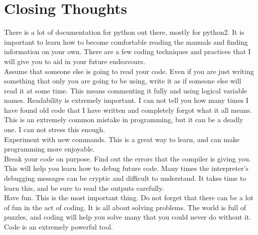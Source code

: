 \documentclass[11pt]{article}   %
\begin{document}
\section*{Closing Thoughts}
There is a lot of documentation for python out there, mostly for python2.  It is important to learn how to become comfortable reading the manuals and finding information on your own.  
There are a few coding techniques and practices that I will give you to aid in your future endeavours. 
\\
Assume that someone else is going to read your code.  Even if you are just writing something that only you are going to be using, write it as if someone else will read it at some time.  
This means commenting it fully and using logical variable names.  Readability is extremely important.  I can not tell you how many times I have found old code that I have written and 
completely forgot what it all means.  This is an extremely common mistake in programming, but it can be a deadly one.  I can not stress this enough.
\\
Experiment with new commands.  This is a great way to learn, and can make programming more enjoyable.
\\
Break your code on purpose.  Find out the errors that the compiler is giving you.  This will help you learn how to debug future code.  Many times the interpreter's debugging messages can
be cryptic and difficult to understand.  It takes time to learn this, and be sure to read the outputs carefully.
\\
Have fun.  This is the most important thing.  Do not forget that there can be a lot of fun in the act of coding.  It is all about solving problems.  The world is full of puzzles, and 
coding will help you solve many that you could never do without it.  Code is an extremely powerful tool.
\end{document}
